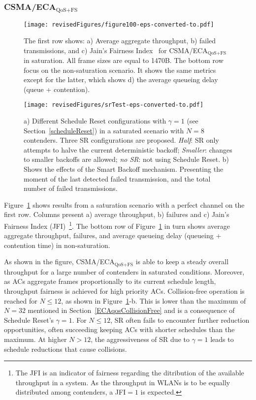 \documentclass[a4paper]{article}
\begin{document}
\subsubsection{CSMA/ECA$_\text{QoS+FS}$}

	\begin{figure}[t]
	\centering
		\texttt{[image: revisedFigures/figure100-eps-converted-to.pdf]}
		\caption{The first row shows: a) Average aggregate throughput, b) failed transmissions, and c) Jain's Fairness Index~\cite{JFI} for CSMA/ECA$_{\text{QoS+FS}}$ in saturation. All frame sizes are equal to 1470B. The bottom row focus on the non-saturation scenario. It shows the same metrics except for the latter, which shows d) the average queueing delay (queue + contention).}
		\label{fig:100}
	\end{figure}

	\begin{figure}[t]
	\centering
		\texttt{[image: revisedFigures/srTest-eps-converted-to.pdf]}
		\caption{a) Different Schedule Reset configurations with $\gamma=1$ (see Section~\ref{scheduleReset}) in a saturated scenario with $N=8$ contenders. Three SR configurations are proposed. \emph{Half}: SR only attempts to halve the current deterministic backoff; \emph{Smaller}: changes to smaller backoffs are allowed; \emph{no SR}: not using Schedule Reset. b) Shows the effects of the Smart Backoff mechanism. Presenting the moment of the last detected failed transmission, and the total number of failed transmissions.}
		\label{srTest}
	\end{figure}

Figure~\ref{fig:100} shows results from a saturation scenario with a perfect channel on the first row. Columns present a) average throughput, b) failures and c) Jain's Fairness Index (JFI)~\cite{JFI}\footnote{The JFI is an indicator of fairness regarding the ditribution of the available throughput in a system. As the throughput in WLANs is to be equally distributed among contenders, a JFI$=1$ is expected.}. The bottom row of Figure~\ref{fig:100} in turn shows average aggregate throughput, failures, and average queueing delay (queueing + contention time) in non-saturation.

As shown in the figure, CSMA/ECA$_\text{QoS+FS}$ is able to keep a steady overall throughput for a large number of contenders in saturated conditions. Moreover, as ACs aggregate frames proportionally to its current schedule length, throughput fairness is achieved for high priority ACs. Collision-free operation is reached for $N\le12$, as shown in Figure~\ref{fig:100}-b. This is lower than the maximum of $N=32$ mentioned in Section~\ref{ECAqosCollisionFree} and is a consequence of Schedule Reset's $\gamma=1$. For $N\le12$, SR often fails to encounter further reduction opportunities, often succeeding keeping ACs with shorter schedules than the maximum. At higher $N>12$, the aggressiveness of SR due to $\gamma=1$ leads to schedule reductions that cause collisions.
\end{document}

